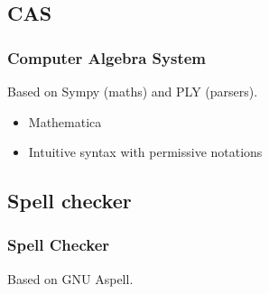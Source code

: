 \subsection{CAS}
\begin{frame}[fragile]
    \frametitle{Computer Algebra System}
    Based on \alert{Sympy} (maths) and \alert{PLY} (parsers).
    
    \vfill    
    
    \begin{itemize}
        \item<3-> Mathematica
        \item<4-> Intuitive syntax with permissive notations 
    \end{itemize}
\end{frame}

\subsection{Spell checker}


\begin{frame}[fragile]
    \frametitle{Spell Checker}
    Based on \alert{GNU Aspell}.

    \medbreak


    \medbreak

\end{frame}
